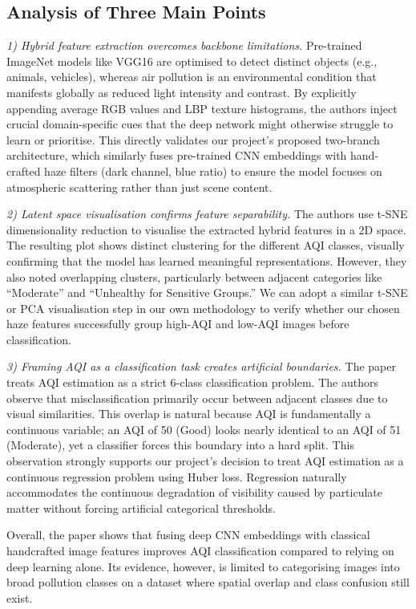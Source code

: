 \documentclass[conference]{IEEEtran}
\begin{document}
\subsection{Analysis of Three Main Points}
\textit{1) Hybrid feature extraction overcomes backbone limitations.} Pre-trained ImageNet models like VGG16 are optimised to detect distinct objects (e.g., animals, vehicles), whereas air pollution is an environmental condition that manifests globally as reduced light intensity and contrast. By explicitly appending average RGB values and LBP texture histograms, the authors inject crucial domain-specific cues that the deep network might otherwise struggle to learn or prioritise. This directly validates our project's proposed two-branch architecture, which similarly fuses pre-trained CNN embeddings with hand-crafted haze filters (dark channel, blue ratio) to ensure the model focuses on atmospheric scattering rather than just scene content.

\textit{2) Latent space visualisation confirms feature separability.} The authors use t-SNE dimensionality reduction to visualise the extracted hybrid features in a 2D space. The resulting plot shows distinct clustering for the different AQI classes, visually confirming that the model has learned meaningful representations. However, they also noted overlapping clusters, particularly between adjacent categories like ``Moderate'' and ``Unhealthy for Sensitive Groups.'' We can adopt a similar t-SNE or PCA visualisation step in our own methodology to verify whether our chosen haze features successfully group high-AQI and low-AQI images before classification.

\textit{3) Framing AQI as a classification task creates artificial boundaries.} The paper treats AQI estimation as a strict 6-class classification problem. The authors observe that misclassification primarily occur between adjacent classes due to visual similarities. This overlap is natural because AQI is fundamentally a continuous variable; an AQI of 50 (Good) looks nearly identical to an AQI of 51 (Moderate), yet a classifier forces this boundary into a hard split. This observation strongly supports our project's decision to treat AQI estimation as a continuous regression problem using Huber loss. Regression naturally accommodates the continuous degradation of visibility caused by particulate matter without forcing artificial categorical thresholds.

Overall, the paper shows that fusing deep CNN embeddings with classical handcrafted image features improves AQI classification compared to relying on deep learning alone. Its evidence, however, is limited to categorising images into broad pollution classes on a dataset where spatial overlap and class confusion still exist.
\end{document}
